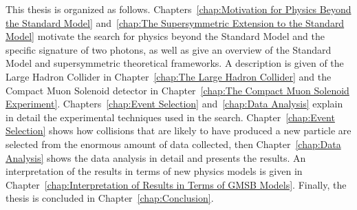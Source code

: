 \documentclass[dissertation.tex]{subfiles}
\begin{document}
This thesis is organized as follows.  Chapters~\ref{chap:Motivation for Physics Beyond the Standard Model} and~\ref{chap:The Supersymmetric Extension to the Standard Model} motivate the search for physics beyond the Standard Model and the specific signature of two photons, as well as give an overview of the Standard Model and supersymmetric theoretical frameworks.  A description is given of the Large Hadron Collider in Chapter~\ref{chap:The Large Hadron Collider} and the Compact Muon Solenoid detector in Chapter~\ref{chap:The Compact Muon Solenoid Experiment}.  Chapters~\ref{chap:Event Selection} and~\ref{chap:Data Analysis} explain in detail the experimental techniques used in the search.  Chapter~\ref{chap:Event Selection} shows how collisions that are likely to have produced a new particle are selected from the enormous amount of data collected, then Chapter~\ref{chap:Data Analysis} shows the data analysis in detail and presents the results.  An interpretation of the results in terms of new physics models is given in Chapter~\ref{chap:Interpretation of Results in Terms of GMSB Models}.  Finally, the thesis is concluded in Chapter~\ref{chap:Conclusion}.
\end{document}
